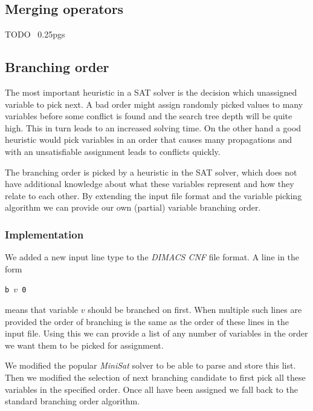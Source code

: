 \subsection{Merging operators}
TODO ~0.25pgs


\subsection{Branching order}
\label{sec:branching-order}

The most important heuristic in a SAT solver is the decision which unassigned variable to pick next.
A bad order might assign randomly picked values to many variables before some conflict is found and the search tree depth will be quite high.
This in turn leads to an increased solving time.
On the other hand a good heuristic would pick variables in an order that causes many propagations and with an unsatisfiable assignment leads to conflicts quickly.

The branching order is picked by a heuristic in the SAT solver, which does not have additional knowledge about what these variables represent and how they relate to each other.
By extending the input file format and the variable picking algorithm we can provide our own (partial) variable branching order.

\subsubsection{Implementation}

We added a new input line type to the \emph{DIMACS CNF} file format.
A line in the form

\centerline{\texttt{b $v$ 0}}

\noindent means that variable $v$ should be branched on first.
When multiple such lines are provided the order of branching is the same as the order of these lines in the input file.
Using this we can provide a list of any number of variables in the order we want them to be picked for assignment.

We modified the popular \emph{MiniSat} solver to be able to parse and store this list.
Then we modified the selection of next branching candidate to first pick all these variables in the specified order.
Once all have been assigned we fall back to the standard branching order algorithm.

